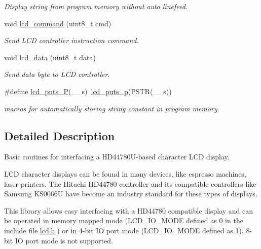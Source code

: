 \begin{DoxyCompactItemize}
\begin{DoxyCompactList}\small\item\em Display string from program memory without auto linefeed. \end{DoxyCompactList}\item 
void \mbox{\hyperlink{group__pfleury__lcd_gaea9d14f02df06f948cb5a56776980826}{lcd\+\_\+command}} (uint8\+\_\+t cmd)
\begin{DoxyCompactList}\small\item\em Send L\+CD controller instruction command. \end{DoxyCompactList}\item 
void \mbox{\hyperlink{group__pfleury__lcd_gad0729d2cba627825a089ca1fff12ba29}{lcd\+\_\+data}} (uint8\+\_\+t data)
\begin{DoxyCompactList}\small\item\em Send data byte to L\+CD controller. \end{DoxyCompactList}\item 
\#define \mbox{\hyperlink{group__pfleury__lcd_ga4f1928f1515e21422d5a33af2949f2f7}{lcd\+\_\+puts\+\_\+P}}(\+\_\+\+\_\+s)~\mbox{\hyperlink{group__pfleury__lcd_ga9022a24a56a9b15681f62eb6ba77e5de}{lcd\+\_\+puts\+\_\+p}}(P\+S\+TR(\+\_\+\+\_\+s))
\begin{DoxyCompactList}\small\item\em macros for automatically storing string constant in program memory \end{DoxyCompactList}\end{DoxyCompactItemize}


\subsection{Detailed Description}
Basic routines for interfacing a H\+D44780\+U-\/based character L\+CD display. 


\begin{DoxyCode}{0}
\end{DoxyCode}


L\+CD character displays can be found in many devices, like espresso machines, laser printers. The Hitachi H\+D44780 controller and its compatible controllers like Samsung K\+S0066U have become an industry standard for these types of displays.

This library allows easy interfacing with a H\+D44780 compatible display and can be operated in memory mapped mode (L\+C\+D\+\_\+\+I\+O\+\_\+\+M\+O\+DE defined as 0 in the include file \mbox{\hyperlink{lcd_8h}{lcd.\+h}}.) or in 4-\/bit IO port mode (L\+C\+D\+\_\+\+I\+O\+\_\+\+M\+O\+DE defined as 1). 8-\/bit IO port mode is not supported.

